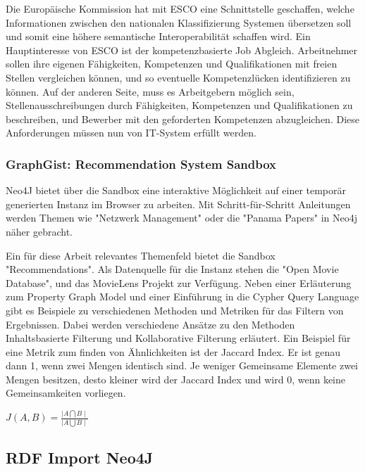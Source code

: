 Die Europäische Kommission hat mit ESCO eine Schnittstelle geschaffen, welche Informationen zwischen den nationalen Klassifizierung Systemen übersetzen soll und somit eine höhere semantische Interoperabilität schaffen wird. Ein Hauptinteresse von ESCO ist der kompetenzbasierte Job Abgleich. Arbeitnehmer sollen ihre eigenen Fähigkeiten, Kompetenzen und Qualifikationen mit freien Stellen vergleichen können, und so eventuelle Kompetenzlücken identifizieren zu können. Auf der anderen Seite, muss es Arbeitgebern möglich sein, Stellenausschreibungen durch  Fähigkeiten, Kompetenzen und Qualifikationen zu beschreiben, und Bewerber mit den geforderten Kompetenzen abzugleichen. Diese Anforderungen müssen nun von IT-System erfüllt werden. 


\subsubsection{GraphGist: Recommendation System Sandbox}\label{recommender}

Neo4J bietet über die Sandbox eine interaktive Möglichkeit auf einer temporär generierten Instanz im Browser zu arbeiten. Mit Schritt-für-Schritt Anleitungen werden Themen wie "Netzwerk Management" oder die "Panama Papers" in Neo4j näher gebracht. 

Ein für diese Arbeit relevantes Themenfeld bietet die Sandbox "Recommendations".\cite{neo4j} Als Datenquelle für die Instanz stehen die "Open Movie Database"\cite{omdb}, und das MovieLens Projekt\cite{grouplens_2016} zur Verfügung.
Neben einer Erläuterung zum Property Graph Model und einer Einführung in die Cypher Query Language gibt es Beispiele zu verschiedenen Methoden und Metriken für das Filtern von Ergebnissen. Dabei werden verschiedene Ansätze zu den Methoden Inhaltsbasierte Filterung und Kollaborative Filterung erläutert. Ein Beispiel für eine Metrik zum finden von Ähnlichkeiten ist der Jaccard Index. Er ist genau dann 1, wenn zwei Mengen identisch sind. Je weniger Gemeinsame Elemente zwei Mengen besitzen, desto kleiner wird der Jaccard Index und wird 0, wenn keine Gemeinsamkeiten vorliegen.
\begin{center}
	$ J(A,B)=\frac{\mid A\bigcap B\mid }{ \mid A \bigcup B \mid }$

\end{center}

\subsection{RDF Import Neo4J}

